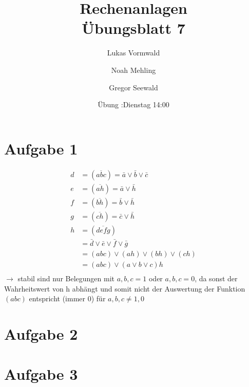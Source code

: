 \documentclass[11pt,a4paper]{article}
\title{Rechenanlagen\\Übungsblatt 7}
\author{Lukas Vormwald \and Noah Mehling \and Gregor Seewald}
\date{Übung :Dienstag 14:00}
\newcommand{\Aufgabe}[1]{\section{Aufgabe #1}}
\begin{document}
\maketitle

  \Aufgabe{1}

    \begin{align*}
      d&=\left(\overline{abc}\right)=\bar{a}\vee\bar{b}\vee\bar{c}\\
      e&=\left(\overline{ah}\right)=\bar{a}\vee\bar{h}\\
      f&=\left(\overline{bh}\right)=\bar{b}\vee\bar{h}\\
      g&=\left(\overline{ch}\right)=\bar{c}\vee\bar{h}\\
      h&=\left(\overline{defg}\right)\\
      &=\bar{d}\vee\bar{e}\vee\bar{f}\vee\bar{g}\\
      &=\left(abc\right)\vee\left(ah\right)\vee\left(bh\right)\vee\left(ch\right)\\
      &=\left(abc\right)\vee\left(a\vee b\vee c\right)h\\
    \end{align*}
    $\rightarrow$ stabil sind nur Belegungen mit $a,b,c=1$ oder $a,b,c=0$, da sonst der Wahrheitswert von h abhängt und somit nicht der Auswertung der Funktion $\left(abc\right)$ entspricht (immer $0$) für $a,b,c\neq 1,0$

  \Aufgabe{2}

    
    

  \Aufgabe{3}
\end{document}

